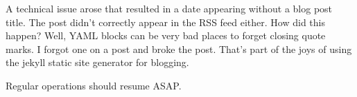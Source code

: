 A technical issue arose that resulted in a date appearing without a blog
post title. The post didn't correctly appear in the RSS feed either. How
did this happen? Well, YAML blocks can be very bad places to forget
closing quote marks. I forgot one on a post and broke the post. That's
part of the joys of using the jekyll static site generator for blogging.

Regular operations should resume ASAP.
